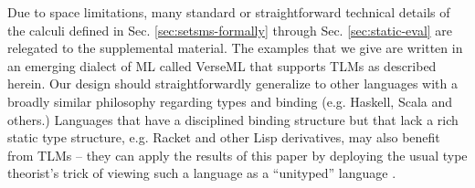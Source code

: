 \documentclass[acmsmall,10pt,review,anonymous]{acmart}\settopmatter{printfolios=true}
\begin{document}
Due to space limitations, many standard or straightforward technical details of the calculi defined in Sec. \ref{sec:setsms-formally} through Sec. \ref{sec:static-eval} are relegated to the supplemental material. The examples that we give are written in an emerging dialect of ML called VerseML that supports TLMs as described herein. Our design should straightforwardly generalize to other languages with a broadly similar philosophy regarding types and binding (e.g. Haskell, Scala and others.) Languages that have a disciplined binding structure but that lack a rich static type structure, e.g. Racket and other Lisp derivatives, may also benefit from TLMs -- they can apply the results of this paper by deploying the usual type theorist's trick of viewing such a language as a ``{unityped}'' language \cite{pfpl,scott1980lambda}. %
\end{document}

